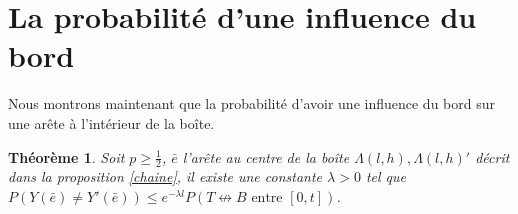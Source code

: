 \documentclass[titlepage,a4paper,12pt]{article}
\newcounter{thm}
\newcounter{prop}
\newtheorem{cvg}[thm]{Théorème}
\newtheorem{tension}[prop]{Proposition}
\begin{document}
\begin{comment}
Nous étudions la constante $\gamma(p,t)$ et nous avons la proposition suivante:
\begin{tension}$\frac{\gamma(p,t)}{\gamma(p,0)} \rightarrow 1$ quand $p\rightarrow 1$.
\end{tension}
\begin{proof}
Nous utilisons le fait que $\lim_n \frac{1}{n}\ln P(O\longleftrightarrow n\mathbf{e}_1) = \lim_n \frac{1}{n}\ln P(O\longleftrightarrow \partial \Lambda_n)$ et nous considérons une boite de taille $n$. Nous remarquons le nombre d'arête qui se ferme entre $[0,t]$ est borné par une loi de Poisson de paramètre $n^2(1-p)t$. Nous notons $N$ le nombre de bout d'un space-time chemin, c'est-à-dire le nombre de chemins fermés tel que $$ (O,0) = (x_1,\theta_1) \longleftrightarrow (x_1,\theta_2) \longleftrightarrow (x_2,\theta_2)\dots \longleftrightarrow (x_N,\theta_N) \longleftrightarrow (\partial\Lambda_n,t).
$$
Nous avons donc $N$ est borné par une variable aléatoire de loi de Poisson de paramètre $n^2(1-p)t$. Quand $p\rightarrow 1$, nous pouvons rendre $N$ d'ordre de 1 avec une probabilité proche de 1 et nous avons le résultat.
\end{proof}
\end{comment}
\section{La probabilité d'une influence du bord}

Nous montrons maintenant que la probabilité d'avoir une influence du bord sur une arête à l'intérieur de la boîte. 
\begin{cvg}
Soit $p\geqslant \frac{1}{2}$, $\bar{e}$ l'arête au centre de la boîte $\Lambda(l,h), \Lambda(l,h)'$ décrit dans la proposition \ref{chaine}, il existe une constante $\lambda> 0$ tel que $P(Y(\bar{e})\neq Y'(\bar{e})) \leqslant e^{-\lambda l} P(T\nleftrightarrow B \text{ entre }[0,t])$.
\end{cvg}
\end{document}
